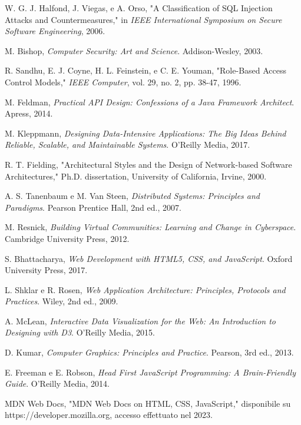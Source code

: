 \begin{thebibliography}{99}
W. G. J. Halfond, J. Viegas, e A. Orso, "A Classification of SQL Injection Attacks and Countermeasures," in \textit{IEEE International Symposium on Secure Software Engineering}, 2006.

M. Bishop, \textit{Computer Security: Art and Science}. Addison-Wesley, 2003.

R. Sandhu, E. J. Coyne, H. L. Feinstein, e C. E. Youman, "Role-Based Access Control Models," \textit{IEEE Computer}, vol. 29, no. 2, pp. 38-47, 1996.

M. Feldman, \textit{Practical API Design: Confessions of a Java Framework Architect}. Apress, 2014.

M. Kleppmann, \textit{Designing Data-Intensive Applications: The Big Ideas Behind Reliable, Scalable, and Maintainable Systems}. O'Reilly Media, 2017.

R. T. Fielding, "Architectural Styles and the Design of Network-based Software Architectures," Ph.D. dissertation, University of California, Irvine, 2000.

A. S. Tanenbaum e M. Van Steen, \textit{Distributed Systems: Principles and Paradigms}. Pearson Prentice Hall, 2nd ed., 2007.

M. Resnick, \textit{Building Virtual Communities: Learning and Change in Cyberspace}. Cambridge University Press, 2012.

S. Bhattacharya, \textit{Web Development with HTML5, CSS, and JavaScript}. Oxford University Press, 2017.

L. Shklar e R. Rosen, \textit{Web Application Architecture: Principles, Protocols and Practices}. Wiley, 2nd ed., 2009.

A. McLean, \textit{Interactive Data Visualization for the Web: An Introduction to Designing with D3}. O'Reilly Media, 2015.

D. Kumar, \textit{Computer Graphics: Principles and Practice}. Pearson, 3rd ed., 2013.

E. Freeman e E. Robson, \textit{Head First JavaScript Programming: A Brain-Friendly Guide}. O'Reilly Media, 2014.

MDN Web Docs, "MDN Web Docs on HTML, CSS, JavaScript," disponibile su https://developer.mozilla.org, accesso effettuato nel 2023.


\end{thebibliography}
